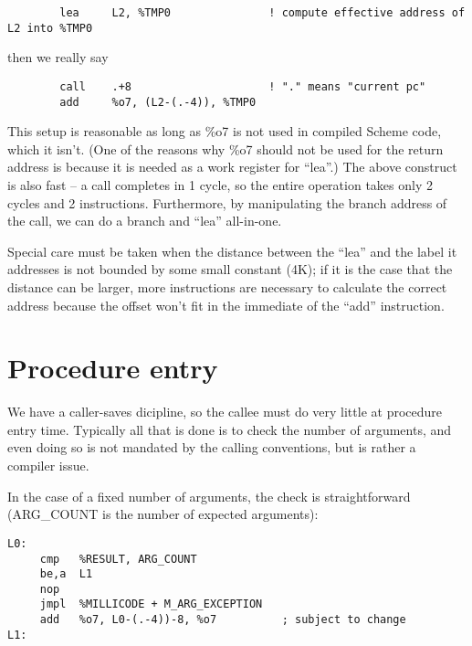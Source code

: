 \begin{verbatim}
        lea     L2, %TMP0               ! compute effective address of L2 into %TMP0
\end{verbatim}

then we really say

\begin{minipage}{\linewidth}
\begin{verbatim}
        call    .+8                     ! "." means "current pc"
        add     %o7, (L2-(.-4)), %TMP0
\end{verbatim}
\end{minipage}

This setup is reasonable as long as \%o7 is not used in compiled Scheme
code, which it isn't. (One of the reasons why \%o7 should not be used
for the return address is because it is needed as a work register for
``lea''.)  The above construct is also fast -- a call completes in 1
cycle, so the entire operation takes only 2 cycles and 2 instructions.
Furthermore, by manipulating the branch address of the call, we can do
a branch and ``lea'' all-in-one.

Special care must be taken when the distance between the ``lea'' and the 
label it addresses is not bounded by some small constant (4K); if it is
the case that the distance can be larger, more instructions are necessary
to calculate the correct address because the offset won't fit in the
immediate of the ``add'' instruction.

\section{Procedure entry}

We have a caller-saves dicipline, so the callee must do very little at
procedure entry time. Typically all that is done is to check the number
of arguments, and even doing so is not mandated by the calling conventions,
but is rather a compiler issue.

In the case of a fixed number of arguments, the check is straightforward
(ARG\_COUNT is the number of expected arguments):

\begin{minipage}{\linewidth}
\begin{verbatim}
L0:
     cmp   %RESULT, ARG_COUNT
     be,a  L1
     nop
     jmpl  %MILLICODE + M_ARG_EXCEPTION
     add   %o7, L0-(.-4))-8, %o7          ; subject to change
L1:
\end{verbatim}
\end{minipage}

